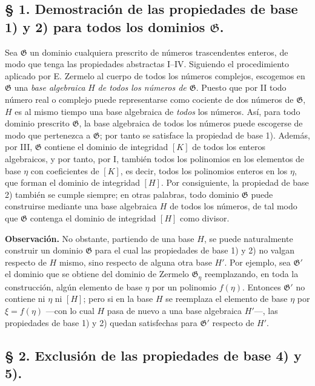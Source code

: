 \documentclass[11pt]{article}
\begin{document}
\subsection*{§ 1. Demostración de las propiedades de base 1) y 2) para todos los dominios $\mathfrak G$.}

Sea $\mathfrak G$ un dominio cualquiera prescrito de números trascendentes enteros, de modo que tenga las propiedades abstractas I--IV. Siguiendo el procedimiento aplicado por E. Zermelo al cuerpo de todos los números complejos, escogemos en $\mathfrak G$ una \emph{base algebraica} $H$ \emph{de todos los números de $\mathfrak G$}. Puesto que por II todo número real o complejo puede representarse como cociente de dos números de $\mathfrak G$, $H$ es al mismo tiempo una base algebraica de \emph{todos} los números. Así, para todo dominio prescrito $\mathfrak G$, la base algebraica de todos los números puede escogerse de modo que pertenezca a $\mathfrak G$; por tanto se satisface la propiedad de base 1). Además, por III, $\mathfrak G$ contiene el dominio de integridad $[K]$ de todos los enteros algebraicos, y por tanto, por I, también todos los polinomios en los elementos de base $\eta$ con coeficientes de $[K]$, es decir, todos los polinomios enteros en los $\eta$, que forman el dominio de integridad $[H]$. Por consiguiente, la propiedad de base 2) también se cumple siempre; en otras palabras, todo dominio $\mathfrak G$ puede construirse mediante una base algebraica $H$ de todos los números, de tal modo que $\mathfrak G$ contenga el dominio de integridad $[H]$ como divisor.

\textbf{Observación.} No obstante, partiendo de una base $H$, se puede naturalmente construir un dominio $\mathfrak G$ para el cual las propiedades de base 1) y 2) no valgan respecto de $H$ mismo, sino respecto de alguna otra base $H'$. Por ejemplo, sea $\mathfrak G'$ el dominio que se obtiene del dominio de Zermelo $\mathfrak G_\eta$ reemplazando, en toda la construcción, algún elemento de base $\eta$ por un polinomio $f(\eta)$. Entonces $\mathfrak G'$ no contiene ni $\eta$ ni $[H]$; pero si en la base $H$ se reemplaza el elemento de base $\eta$ por $\xi=f(\eta)$ ---con lo cual $H$ pasa de nuevo a una base algebraica $H'$---, las propiedades de base 1) y 2) quedan satisfechas para $\mathfrak G'$ respecto de $H'$.

\subsection*{§ 2. Exclusión de las propiedades de base 4) y 5).}
\end{document}

